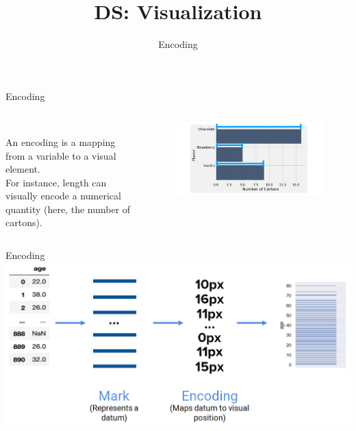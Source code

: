 \documentclass[aspectratio=169]{../latex_main/tntbeamer}  %
\title[Visualization]{DS: Visualization}
\subtitle{Encoding}
\begin{document}
	
	\maketitle
	\begin{frame}{Encoding}
	    \begin{columns}
	        \begin{column}{.4\textwidth}
	               \bigskip
	                \bigskip
	              \\An encoding is a mapping from a variable to a visual element.\\
	              \bigskip
	              For instance, length can visually encode a numerical quantity (here, the number of cartons). 
	        \end{column}
	        
	        \begin{column}{.4\textwidth}
	              \begin{figure}
	                  \includegraphics[scale=.5]{Bild11}
	               \end{figure}
	        \end{column}
	        
	    \end{columns}
	\end{frame}
	
	
	\begin{frame}[c]{Encoding}
	    \centering
	    \includegraphics[scale=.4]{Bild12}
	\end{frame}
	
\end{document}
